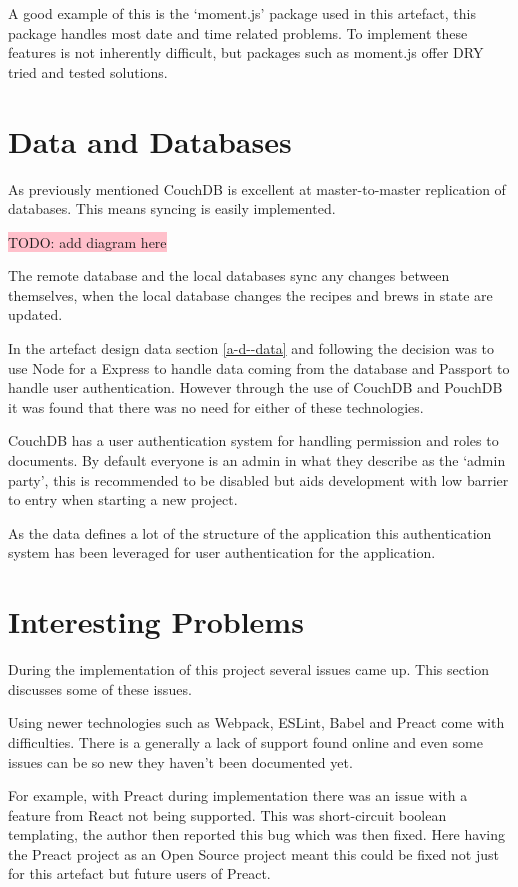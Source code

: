 A good example of this is the `moment.js' package used in this artefact, this package handles most date and time related problems. To implement these features is not inherently difficult, but packages such as moment.js offer DRY tried and tested solutions. \cite{moment.js}

\section{Data and Databases} \label{s-i--data-and-databases}

As previously mentioned CouchDB is excellent at master-to-master replication of databases. This means syncing is easily implemented.

\colorbox{pink}{TODO: add diagram here}

The remote database and the local databases sync any changes between themselves, when the local database changes the recipes and brews in state are updated.

In the artefact design data section \ref{a-d--data} and following the decision was to use Node for a Express to handle data coming from the database and Passport to handle user authentication. However through the use of CouchDB and PouchDB it was found that there was no need for either of these technologies.

CouchDB has a user authentication system for handling permission and roles to documents. By default everyone is an admin in what they describe as the `admin party', this is recommended to be disabled but aids development with low barrier to entry when starting a new project.

As the data defines a lot of the structure of the application this authentication system has been leveraged for user authentication for the application.

\section{Interesting Problems} \label{s-i--interesting-problems}

During the implementation of this project several issues came up. This section discusses some of these issues.

Using newer technologies such as Webpack, ESLint, Babel and Preact come with difficulties. There is a generally a lack of support found online and even some issues can be so new they haven't been documented yet.

For example, with Preact during implementation there was an issue with a feature from React not being supported. This was short-circuit boolean templating, the author then reported this bug which was then fixed. Here having the Preact project as an Open Source project meant this could be fixed not just for this artefact but future users of Preact.


